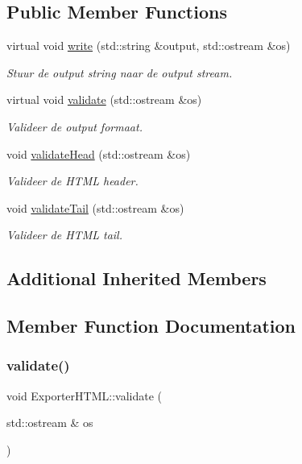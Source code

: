 \subsection*{Public Member Functions}
\begin{DoxyCompactItemize}
\item 
virtual void \hyperlink{class_exporter_h_t_m_l_ace2649c240282289d4cb3bfbd19e427c}{write} (std\+::string \&output, std\+::ostream \&os)
\begin{DoxyCompactList}\small\item\em Stuur de output string naar de output stream. \end{DoxyCompactList}\item 
virtual void \hyperlink{class_exporter_h_t_m_l_a85662c826df00e13015d8c64325d7fd6}{validate} (std\+::ostream \&os)
\begin{DoxyCompactList}\small\item\em Valideer de output formaat. \end{DoxyCompactList}\item 
void \hyperlink{class_exporter_h_t_m_l_a2c8b00996daf897449a15d87fa7c0e13}{validate\+Head} (std\+::ostream \&os)
\begin{DoxyCompactList}\small\item\em Valideer de H\+T\+ML header. \end{DoxyCompactList}\item 
void \hyperlink{class_exporter_h_t_m_l_a82a0ea3877a2ea4b167281016c46f4ad}{validate\+Tail} (std\+::ostream \&os)
\begin{DoxyCompactList}\small\item\em Valideer de H\+T\+ML tail. \end{DoxyCompactList}\end{DoxyCompactItemize}
\subsection*{Additional Inherited Members}


\subsection{Member Function Documentation}
\mbox{\label{class_exporter_h_t_m_l_a85662c826df00e13015d8c64325d7fd6}} 
\subsubsection{\texorpdfstring{validate()}{validate()}}
{\footnotesize\ttfamily void Exporter\+H\+T\+M\+L\+::validate (\begin{DoxyParamCaption}\item[{std\+::ostream \&}]{os }\end{DoxyParamCaption})\hspace{0.3cm}{\ttfamily [virtual]}}




